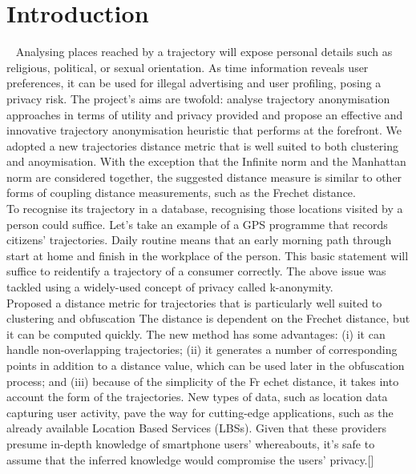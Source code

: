 \section{Introduction}~\label{sec:introduction}
Analysing places reached by a trajectory will expose personal details such
as religious, political, or sexual orientation. As time information reveals user
preferences, it can be used for illegal advertising and user profiling, posing a privacy
risk. The project's aims are twofold: analyse trajectory anonymisation approaches in
terms of utility and privacy provided and propose an effective and innovative
trajectory anonymisation heuristic that performs at the forefront. We adopted a
new trajectories distance metric that is well suited to both clustering and
anoymisation. With the exception that the Infinite norm and the Manhattan norm
are considered together, the suggested distance measure is similar to other forms of
coupling distance measurements, such as the Frechet distance.\\
To recognise its trajectory in a database, recognising those locations visited by a
person could suffice. Let's take an example of a GPS programme that records
citizens' trajectories. Daily routine means that an early morning path through start at
home and finish in the workplace of the person. This basic statement will suffice to
reidentify a trajectory of a consumer correctly. The above issue was tackled using a
widely-used concept of privacy called k-anonymity.\\
Proposed a distance metric for trajectories that is particularly well suited to
clustering and obfuscation The distance is dependent on the Frechet distance, but it
can be computed quickly. The new method has some advantages: (i) it can handle
non-overlapping trajectories; (ii) it generates a number of corresponding points in
addition to a distance value, which can be used later in the obfuscation process; and
(iii) because of the simplicity of the Fr echet distance, it takes into account the form
of the trajectories.
New types of data, such as location data capturing user activity, pave the way for cutting-edge applications, such as the already available Location Based Services (LBSs). Given that these providers presume in-depth knowledge of smartphone users' whereabouts, it's safe to assume that the inferred knowledge would compromise the users' privacy.[]